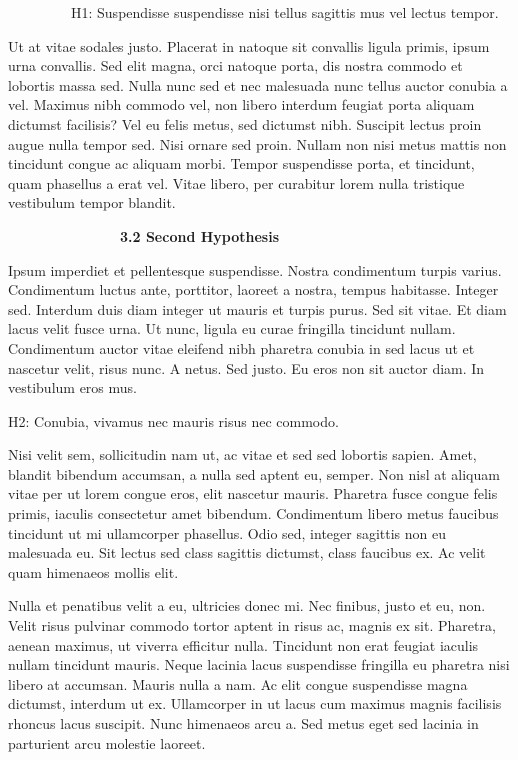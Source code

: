 \documentclass[
]{article}
\begin{document}
~~~~~~~~~H1: Suspendisse suspendisse nisi tellus sagittis mus vel lectus
tempor.

Ut at vitae sodales justo. Placerat in natoque sit convallis ligula
primis, ipsum urna convallis. Sed elit magna, orci natoque porta, dis
nostra commodo et lobortis massa sed. Nulla nunc sed et nec malesuada
nunc tellus auctor conubia a vel. Maximus nibh commodo vel, non libero
interdum feugiat porta aliquam dictumst facilisis? Vel eu felis metus,
sed dictumst nibh. Suscipit lectus proin augue nulla tempor sed. Nisi
ornare sed proin. Nullam non nisi metus mattis non tincidunt congue ac
aliquam morbi. Tempor suspendisse porta, et tincidunt, quam phasellus a
erat vel. Vitae libero, per curabitur lorem nulla tristique vestibulum
tempor blandit.

~~~~~~~~~~~~~~~~\textbf{3.2 Second Hypothesis}

Ipsum imperdiet et pellentesque suspendisse. Nostra condimentum turpis
varius. Condimentum luctus ante, porttitor, laoreet a nostra, tempus
habitasse. Integer sed. Interdum duis diam integer ut mauris et turpis
purus. Sed sit vitae. Et diam lacus velit fusce urna. Ut nunc, ligula eu
curae fringilla tincidunt nullam. Condimentum auctor vitae eleifend nibh
pharetra conubia in sed lacus ut et nascetur velit, risus nunc. A netus.
Sed justo. Eu eros non sit auctor diam. In vestibulum eros mus.

H2: Conubia, vivamus nec mauris risus nec commodo.

Nisi velit sem, sollicitudin nam ut, ac vitae et sed sed lobortis
sapien. Amet, blandit bibendum accumsan, a nulla sed aptent eu, semper.
Non nisl at aliquam vitae per ut lorem congue eros, elit nascetur
mauris. Pharetra fusce congue felis primis, iaculis consectetur amet
bibendum. Condimentum libero metus faucibus tincidunt ut mi ullamcorper
phasellus. Odio sed, integer sagittis non eu malesuada eu. Sit lectus
sed class sagittis dictumst, class faucibus ex. Ac velit quam himenaeos
mollis elit.

Nulla et penatibus velit a eu, ultricies donec mi. Nec finibus, justo et
eu, non. Velit risus pulvinar commodo tortor aptent in risus ac, magnis
ex sit. Pharetra, aenean maximus, ut viverra efficitur nulla. Tincidunt
non erat feugiat iaculis nullam tincidunt mauris. Neque lacinia lacus
suspendisse fringilla eu pharetra nisi libero at accumsan. Mauris nulla
a nam. Ac elit congue suspendisse magna dictumst, interdum ut ex.
Ullamcorper in ut lacus cum maximus magnis facilisis rhoncus lacus
suscipit. Nunc himenaeos arcu a. Sed metus eget sed lacinia in
parturient arcu molestie laoreet.
\end{document}
